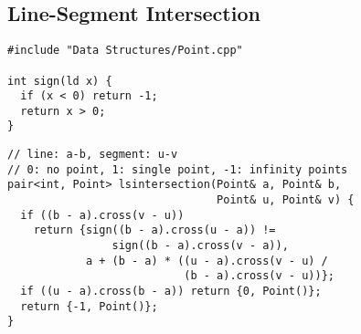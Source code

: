 \documentclass[twoside]{article}
\begin{document}
\begin{multicols*}{2}
\subsection*{Line-Segment Intersection}
\begin{verbatim}
#include "Data Structures/Point.cpp"

int sign(ld x) {
  if (x < 0) return -1;
  return x > 0;
}
\end{verbatim}
\vspace{-12pt}
\begin{verbatim}
// line: a-b, segment: u-v
// 0: no point, 1: single point, -1: infinity points
pair<int, Point> lsintersection(Point& a, Point& b,
                                Point& u, Point& v) {
  if ((b - a).cross(v - u))
    return {sign((b - a).cross(u - a)) !=
                sign((b - a).cross(v - a)),
            a + (b - a) * ((u - a).cross(v - u) /
                           (b - a).cross(v - u))};
  if ((u - a).cross(b - a)) return {0, Point()};
  return {-1, Point()};
}
\end{verbatim}

\subsectionfont{\large\bfseries\sffamily\underline}

\end{multicols*}
\end{document}
